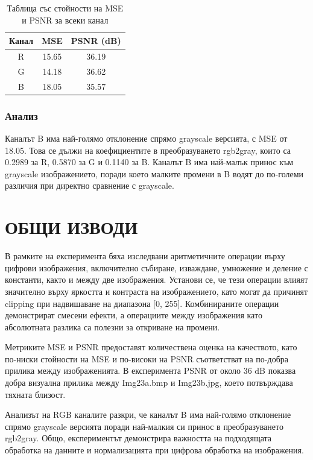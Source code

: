 \documentclass[12pt]{article}
\begin{document}
\begin{table}[H]
\centering
\begin{tabular}{|c|c|c|}
Канал & MSE & PSNR (dB) \\
\hline
R     & 15.65 & 36.19 \\
G     & 14.18 & 36.62 \\
B     & 18.05 & 35.57 \\
\hline
\end{tabular}
\caption{Таблица със стойности на MSE и PSNR за всеки канал}
\end{table}

\subsubsection{Анализ}
Каналът B има най-голямо отклонение спрямо grayscale версията, с MSE от 18.05. Това се дължи на коефициентите в преобразуването rgb2gray, които са 0.2989 за R, 0.5870 за G и 0.1140 за B. Каналът B има най-малък принос към grayscale изображението, поради което малките промени в B водят до по-големи различия при директно сравнение с grayscale.

\section{ОБЩИ ИЗВОДИ}

В рамките на експеримента бяха изследвани аритметичните операции върху цифрови изображения, включително събиране, изваждане, умножение и деление с константи, както и между две изображения. Установи се, че тези операции влияят значително върху яркостта и контраста на изображението, като могат да причинят clipping при надвишаване на диапазона [0, 255]. Комбинираните операции демонстрират смесени ефекти, а операциите между изображения като абсолютната разлика са полезни за откриване на промени.

Метриките MSE и PSNR предоставят количествена оценка на качеството, като по-ниски стойности на MSE и по-високи на PSNR съответстват на по-добра прилика между изображенията. В експеримента PSNR от около 36 dB показва добра визуална прилика между Img23a.bmp и Img23b.jpg, което потвърждава тяхната близост.

Анализът на RGB каналите разкри, че каналът B има най-голямо отклонение спрямо grayscale версията поради най-малкия си принос в преобразуването rgb2gray. Общо, експериментът демонстрира важността на подходящата обработка на данните и нормализацията при цифрова обработка на изображения.
\end{document}
